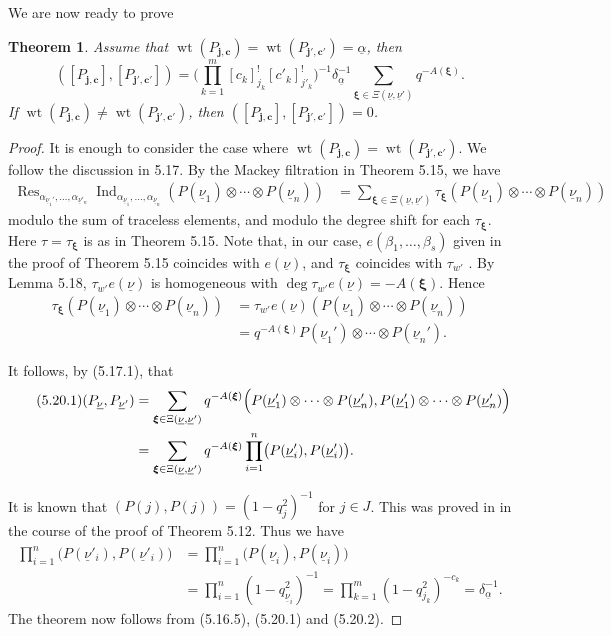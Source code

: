\documentclass[12pt]{amsart}
\renewcommand\a{\alpha}
\renewcommand\b{\beta}
\renewcommand\d{\delta}
\renewcommand{\1}{\mathbb 1}
\newcommand\Bj{\mathbf j}
\newcommand\Bc{\mathbf c}
\newcommand\Bxi{\boldsymbol\xi}
\newcommand\iv{^{-1}}
\newcommand\ul{\underline}
\newcommand\Ind{\operatorname{Ind}}
\newcommand\Res{\operatorname{Res}}
\newcommand\weit{\operatorname{wt}}
\numberwithin{equation}{section}
\newtheorem{thm}{Theorem}[section]
\begin{document}
We are now ready to prove

\begin{thm}  %
Assume that
$\weit (P_{\Bj,\Bc}) = \weit (P_{\Bj',\Bc'}) = \ul\a$,
then    
\begin{equation*}
  ([P_{\Bj,\Bc}], [P_{\Bj', \Bc'}])
  = \biggl(\prod_{k=1}^m [c_k]_{j_k}^! [c'_k]_{j'_k}^!\biggr)\iv\d_{\ul\a}\iv
       \sum_{\Bxi \in \Xi(\ul\nu, \ul\nu')}q^{-A(\Bxi)}. 
\end{equation*}  
If $\weit (P_{\Bj,\Bc}) \ne \weit(P_{\Bj', \Bc'})$,
then $([P_{\Bj,\Bc}], [P_{\Bj',\Bc'}]) = 0$.
\end{thm}
\begin{proof}
It is enough to consider the case where $\weit(P_{\Bj,\Bc}) = \weit(P_{\Bj',\Bc'})$. 
We follow the discussion in 5.17. 
By the Mackey filtration in Theorem 5.15, we have
\begin{align*}
  \Res_{\a_{\ul\nu_1'}, \dots, \a_{\ul\nu'_n}}\Ind_{\a_{\ul\nu_1}, \dots, \a_{\ul\nu_n}}
        (P(\ul\nu_1)\otimes \cdots \otimes P(\ul\nu_n))
  &= \sum_{\Bxi \in \Xi(\ul\nu,\ul\nu')}\tau_{\Bxi}
                    (P(\ul\nu_1)\otimes \cdots \otimes P(\ul\nu_n)) 
\end{align*}
modulo the sum of traceless elements, and modulo the degree shift for each $\tau_{\Bxi}$. 
Here $\tau = \tau_{\Bxi}$ is as in Theorem 5.15.
Note that, in our case,  $e(\b_1, \dots, \b_s)$ given in the proof of Theorem 5.15
coincides with $e(\ul\nu)$, and $\tau_{\Bxi}$ coincides with $\tau_{w'}$ .
By Lemma 5.18, $\tau_{w'}e(\ul\nu)$ is homogeneous with
$\deg\tau_{w'}e(\ul\nu) = -A(\Bxi)$. Hence 
\begin{align*}
\tau_{\Bxi}(P(\ul\nu_1)\otimes\cdots\otimes P(\ul\nu_n))
   &= \tau_{w'}e(\ul\nu)(P(\ul\nu_1)\otimes\cdots\otimes P(\ul\nu_n))  \\
   &= q^{-A(\Bxi)}P(\ul\nu_1')\otimes\cdots\otimes P(\ul\nu_n').  
\end{align*}

It follows, by (5.17.1),  that
\begin{align*}
\tag{5.20.1}  
(P_{\ul\nu}, P_{\ul\nu'}) &=  \sum_{\Bxi \in \Xi(\ul\nu,\ul\nu')}q^{-A(\Bxi)}
  \Bigl(P(\ul\nu'_1)\otimes \cdots \otimes P(\ul\nu'_n),
          P(\ul\nu'_1)\otimes \cdots \otimes P(\ul\nu'_n)\Bigr) \\
          &= \sum_{\Bxi \in \Xi(\ul\nu,\ul\nu')}q^{-A(\Bxi)}\prod_{i = 1}^n
             \bigl(P(\ul\nu'_i), P(\ul\nu'_i)\bigr).
\end{align*}  

It is known that $(P(j), P(j)) = (1- q_j^2)\iv$ for $j \in J$.  This was
proved in \cite{M} in the course of the proof of Theorem 5.12.  Thus we have 
\begin{align*}
\tag{5.20.2}  
\prod_{i=1}^n \bigl(P(\ul\nu'_i), P(\ul\nu'_i)\bigr)
            &= \prod_{i=1}^n \bigl(P(\ul\nu_i), P(\ul\nu_i)\bigr)  \\ 
                         &= \prod_{i = 1}^n(1 - q_{\ul\nu_i}^2)\iv
                               = \prod_{k = 1}^m (1 - q_{j_k}^2)^{-c_k} = \d_{\ul\a}\iv.
\end{align*}
The theorem now follows from (5.16.5), (5.20.1) and (5.20.2). 
\end{proof}  
\end{document}

